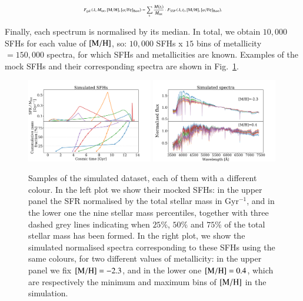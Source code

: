 \begin{equation}
\resizebox{.49 \textwidth}{!} 
{$
F_{\text{gal}} \left( \lambda,M_{\text{tot}},\rm{[M/H]},[\alpha / Fe]_{\text{Base}} \right) =\displaystyle \sum_{t_i} \frac{M(t_i)}{M_{\text{tot}}} \cdot F_{\text{SSP}} \left( \lambda,t_i,{\rm{[M/H]}},[\alpha/\rm{Fe}]_{\text{Base}}  \right)
$.}
\end{equation}

Finally, each spectrum is normalised by its median. In total, we obtain $10{,}000$ SFHs for each value of $\rm{[M/H]}$, so: $10{,}000$ SFHs x $15$ bins of metallicity $= 150{,}000$ spectra, for which SFHs and metallicities are known. Examples of the mock SFHs and their corresponding spectra are shown in Fig.~\ref{input}.\\

\begin{figure}[h]
    \centering
    \includegraphics[width=0.49\textwidth]{images/input/sim_sfhs.pdf}
    \includegraphics[width=0.49\textwidth]{images/input/sim_spectra.pdf}
    \caption{Samples of the simulated dataset, each of them with a different colour. In the left plot we show their mocked SFHs: in the upper panel the SFR normalised by the total stellar mass in Gyr$^{-1}$, and in the lower one the nine stellar mass percentiles, together with three dashed grey lines indicating when $25\%$, $50\%$ and $75\%$ of the total stellar mass has been formed. In the right plot, we show the  simulated normalised spectra corresponding to these SFHs using the same colours, for two different values of metallicity: in the upper panel we fix $\rm{[M/H]}=-2.3$, and in the lower one  $\rm{[M/H]}=0.4$, which are respectively the minimum and maximum bins of $\rm{[M/H]}$ in the simulation.}
    \label{input}
\end{figure}


